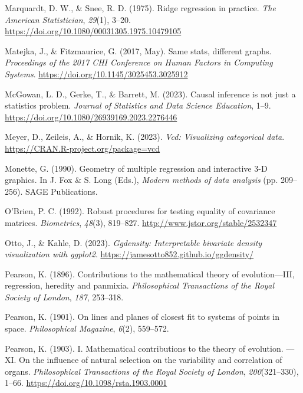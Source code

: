 \documentclass[
  letterpaper,
  10pt,
  krantz2]{krantz}
\newlength{\cslhangindent}
\newlength{\cslentryspacingunit} %
\newenvironment{CSLReferences}[2] %
 {%
  \setlength{\parindent}{0pt}
  \ifodd #1
  \let\oldpar\par
  \def\par{\hangindent=\cslhangindent\oldpar}
  \fi
  \setlength{\parskip}{#2\cslentryspacingunit}
 }%
 {}
\begin{document}
\begin{CSLReferences}{1}{0}
\leavevmode{}%
Marquardt, D. W., \& Snee, R. D. (1975). Ridge regression in practice.
\emph{The American Statistician}, \emph{29}(1), 3--20.
\url{https://doi.org/10.1080/00031305.1975.10479105}

\leavevmode{}%
Matejka, J., \& Fitzmaurice, G. (2017, May). Same stats, different
graphs. \emph{Proceedings of the 2017 {CHI} Conference on Human Factors
in Computing Systems}. \url{https://doi.org/10.1145/3025453.3025912}

\leavevmode{}%
McGowan, L. D., Gerke, T., \& Barrett, M. (2023). Causal inference is
not just a statistics problem. \emph{Journal of Statistics and Data
Science Education}, 1--9.
\url{https://doi.org/10.1080/26939169.2023.2276446}

\leavevmode{}%
Meyer, D., Zeileis, A., \& Hornik, K. (2023). \emph{Vcd: Visualizing
categorical data}. \url{https://CRAN.R-project.org/package=vcd}

\leavevmode{}%
Monette, G. (1990). Geometry of multiple regression and interactive
3-{D} graphics. In J. Fox \& S. Long (Eds.), \emph{Modern methods of
data analysis} (pp. 209--256). SAGE Publications.

\leavevmode{}%
O'Brien, P. C. (1992). Robust procedures for testing equality of
covariance matrices. \emph{Biometrics}, \emph{48}(3), 819--827.
\url{http://www.jstor.org/stable/2532347}

\leavevmode{}%
Otto, J., \& Kahle, D. (2023). \emph{Ggdensity: Interpretable bivariate
density visualization with ggplot2}.
\url{https://jamesotto852.github.io/ggdensity/}

\leavevmode{}%
Pearson, K. (1896). Contributions to the mathematical theory of
evolution---{III}, regression, heredity and panmixia.
\emph{Philosophical Transactions of the Royal Society of London},
\emph{187}, 253--318.

\leavevmode{}%
Pearson, K. (1901). On lines and planes of closest fit to systems of
points in space. \emph{Philosophical Magazine}, \emph{6}(2), 559--572.

\leavevmode{}%
Pearson, K. (1903). I. Mathematical contributions to the theory of
evolution. ---XI. On the influence of natural selection on the
variability and correlation of organs. \emph{Philosophical Transactions
of the Royal Society of London}, \emph{200}(321--330), 1--66.
\url{https://doi.org/10.1098/rsta.1903.0001}


\end{CSLReferences}
\end{document}
